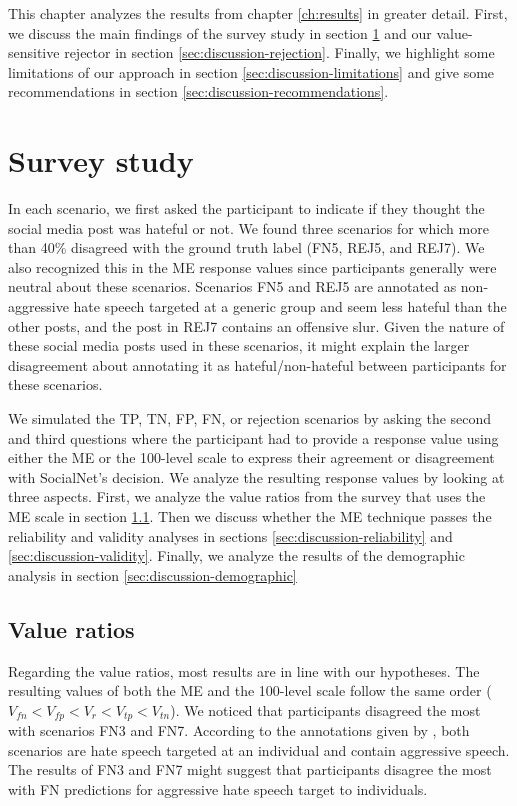 %
This chapter analyzes the results from chapter \ref{ch:results} in greater detail.
%
First, we discuss the main findings of the survey study in section \ref{sec:discussion-survey} and our value-sensitive rejector in section \ref{sec:discussion-rejection}.
%
Finally, we highlight some limitations of our approach in section \ref{sec:discussion-limitations} and give some recommendations in section \ref{sec:discussion-recommendations}.


\section{Survey study}
\label{sec:discussion-survey}
%
In each scenario, we first asked the participant to indicate if they thought the social media post was hateful or not.
%
We found three scenarios for which more than 40\% disagreed with the ground truth label (FN5, REJ5, and REJ7).
%
We also recognized this in the ME response values since participants generally were neutral about these scenarios.
%
Scenarios FN5 and REJ5 are annotated as non-aggressive hate speech targeted at a generic group and seem less hateful than the other posts, and the post in REJ7 contains an offensive slur.
%
Given the nature of these social media posts used in these scenarios, it might explain the larger disagreement about annotating it as hateful/non-hateful between participants for these scenarios.
%

%
We simulated the TP, TN, FP, FN, or rejection scenarios by asking the second and third questions where the participant had to provide a response value using either the ME or the 100-level scale to express their agreement or disagreement with SocialNet's decision.
%
We analyze the resulting response values by looking at three aspects.
%
First, we analyze the value ratios from the survey that uses the ME scale in section \ref{sec:discussion-value-ratios}.
%
Then we discuss whether the ME technique passes the reliability and validity analyses in sections \ref{sec:discussion-reliability} and \ref{sec:discussion-validity}.
%
Finally, we analyze the results of the demographic analysis in section \ref{sec:discussion-demographic}


\subsection{Value ratios}
\label{sec:discussion-value-ratios}
%
Regarding the value ratios, most results are in line with our hypotheses.
%
The resulting values of both the ME and the 100-level scale follow the same order ($V_{fn} < V_{fp} < V_{r} < V_{tp} < V_{tn}$).
%
We noticed that participants disagreed the most with scenarios FN3 and FN7.
%
According to the annotations given by \citet{basile2019semeval}, both scenarios are hate speech targeted at an individual and contain aggressive speech.
%
The results of FN3 and FN7 might suggest that participants disagree the most with FN predictions for aggressive hate speech target to individuals.
%

